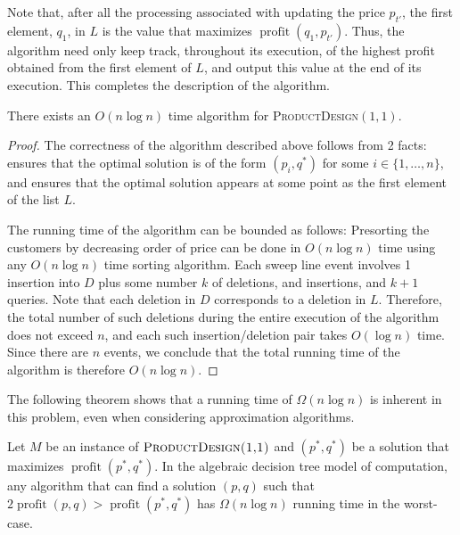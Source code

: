 \documentclass[lotsofwhite]{patmorin}
\newcommand{\val}{\operatorname{profit}}
\begin{document}
Note that, after all the processing associated with updating the price
$p_{t'}$, the first element, $q_1$, in $L$ is the value that maximizes
$\val(q_1,p_{t'})$. Thus, the algorithm need only keep track, throughout
its execution, of the highest profit obtained from the first element of
$L$, and output this value at the end of its execution.  This completes
the description of the algorithm.

\begin{thm}
  There exists an $O(n\log n)$ time algorithm for
  \textsc{ProductDesign$(1,1)$}.
\end{thm}

\begin{proof}
  The correctness of the algorithm described above follows from 2 facts:
   ensures that the optimal solution is of the form
  $(p_i,q^*)$ for some $i\in\{1,\ldots,n\}$, and 
  ensures that the optimal solution appears at some point as the first
  element of the list $L$.

  The running time of the algorithm can be bounded as follows: Presorting
  the customers by decreasing order of price can be done in $O(n\log n)$
  time using any $O(n\log n)$ time sorting algorithm. Each sweep line
  event involves 1 insertion into $D$ plus some number $k$ of deletions,
  and insertions, and $k+1$ queries.  Note that each deletion in $D$
  corresponds to a deletion in $L$.  Therefore, the total number of such
  deletions during the entire execution of the algorithm does not exceed
  $n$, and each such insertion/deletion pair takes $O(\log n)$ time.
  Since there are $n$ events, we conclude that the total running time
  of the algorithm is therefore $O(n\log n)$.
\end{proof}

The following theorem shows that a running time of $\Omega(n\log n)$
is inherent in this problem, even when considering approximation
algorithms.

\begin{lem}
  Let $M$ be an instance of $\textsc{ProductDesign(1,1)}$ and $(p^*,q^*)$
  be a solution that maximizes $\val(p^*,q^*)$.  In the algebraic decision
  tree model of computation, any algorithm that can find a solution
  $(p,q)$ such that $2 \val(p,q) > \val(p^*,q^*)$ has $\Omega(n\log n)$
  running time in the worst-case.
\end{lem}
\end{document}

